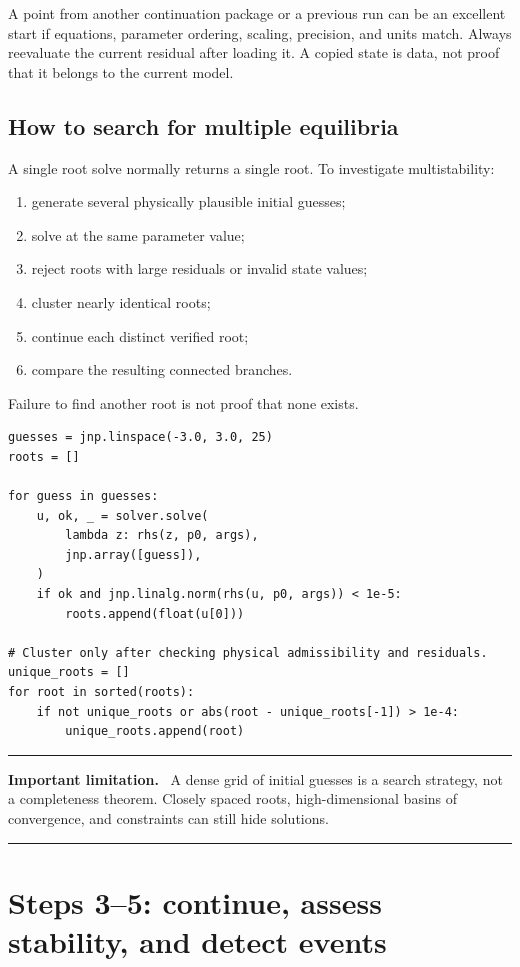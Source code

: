\documentclass[11pt,oneside]{book}
\newenvironment{warningbox}
  {\par\medskip\noindent\begin{minipage}{\textwidth}
   \color{JaxRed}\rule{\textwidth}{0.8pt}\par
   \textbf{Important limitation.}\ \color{black}}
  {\par\color{JaxRed}\rule{\textwidth}{0.8pt}
   \end{minipage}\par\medskip}
\begin{document}
A point from another continuation package or a previous run can be an excellent
start if equations, parameter ordering, scaling, precision, and units match.
Always reevaluate the current residual after loading it. A copied state is data,
not proof that it belongs to the current model.

\section{How to search for multiple equilibria}

A single root solve normally returns a single root. To investigate
multistability:

\begin{enumerate}
  \item generate several physically plausible initial guesses;
  \item solve at the same parameter value;
  \item reject roots with large residuals or invalid state values;
  \item cluster nearly identical roots;
  \item continue each distinct verified root;
  \item compare the resulting connected branches.
\end{enumerate}

Failure to find another root is not proof that none exists.

\begin{lstlisting}
guesses = jnp.linspace(-3.0, 3.0, 25)
roots = []

for guess in guesses:
    u, ok, _ = solver.solve(
        lambda z: rhs(z, p0, args),
        jnp.array([guess]),
    )
    if ok and jnp.linalg.norm(rhs(u, p0, args)) < 1e-5:
        roots.append(float(u[0]))

# Cluster only after checking physical admissibility and residuals.
unique_roots = []
for root in sorted(roots):
    if not unique_roots or abs(root - unique_roots[-1]) > 1e-4:
        unique_roots.append(root)
\end{lstlisting}

\begin{warningbox}
A dense grid of initial guesses is a search strategy, not a completeness
theorem. Closely spaced roots, high-dimensional basins of convergence, and
constraints can still hide solutions.
\end{warningbox}

\chapter{Steps 3--5: continue, assess stability, and detect events}
\end{document}
